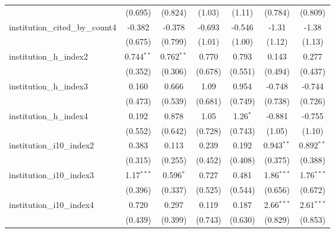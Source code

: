 \begin{tabular}{lcccccc}
                                         & (0.695)       & (0.824)       & (1.03)        & (1.11)        & (0.784)       & (0.809)\\   
   institution\_cited\_by\_count4        & -0.382        & -0.378        & -0.693        & -0.546        & -1.31         & -1.38\\   
                                         & (0.675)       & (0.799)       & (1.01)        & (1.00)        & (1.12)        & (1.13)\\   
   institution\_h\_index2                & 0.744$^{**}$  & 0.762$^{**}$  & 0.770         & 0.793         & 0.143         & 0.277\\   
                                         & (0.352)       & (0.306)       & (0.678)       & (0.551)       & (0.494)       & (0.437)\\   
   institution\_h\_index3                & 0.160         & 0.666         & 1.09          & 0.954         & -0.748        & -0.744\\   
                                         & (0.473)       & (0.539)       & (0.681)       & (0.749)       & (0.738)       & (0.726)\\   
   institution\_h\_index4                & 0.192         & 0.878         & 1.05          & 1.26$^{*}$    & -0.881        & -0.755\\   
                                         & (0.552)       & (0.642)       & (0.728)       & (0.743)       & (1.05)        & (1.10)\\   
   institution\_i10\_index2              & 0.383         & 0.113         & 0.239         & 0.192         & 0.943$^{**}$  & 0.892$^{**}$\\   
                                         & (0.315)       & (0.255)       & (0.452)       & (0.408)       & (0.375)       & (0.388)\\   
   institution\_i10\_index3              & 1.17$^{***}$  & 0.596$^{*}$   & 0.727         & 0.481         & 1.86$^{***}$  & 1.76$^{***}$\\   
                                         & (0.396)       & (0.337)       & (0.525)       & (0.544)       & (0.656)       & (0.672)\\   
   institution\_i10\_index4              & 0.720         & 0.297         & 0.119         & 0.187         & 2.66$^{***}$  & 2.61$^{***}$\\   
                                         & (0.439)       & (0.399)       & (0.743)       & (0.630)       & (0.829)       & (0.853)\\   

\end{tabular}
